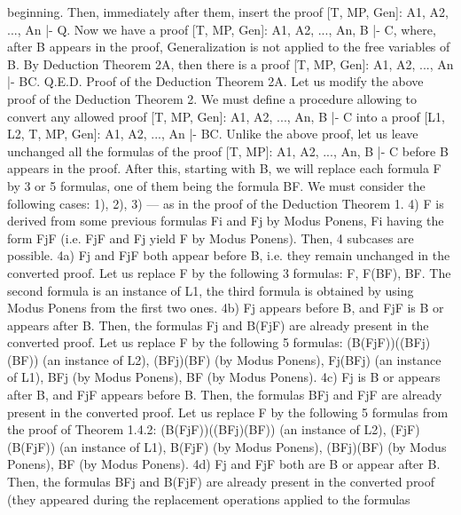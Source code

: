 beginning. Then, immediately after them, insert the proof [T, MP, Gen]: A1, A2, ..., An |- Q. Now we have
a proof [T, MP, Gen]: A1, A2, ..., An, B |- C, where, after B appears in the proof, Generalization is not
applied to the free variables of B. By Deduction Theorem 2A, then there is a proof [T, MP, Gen]: A1,
A2, ..., An |- B\IMPLIES C. Q.E.D.
Proof of the Deduction Theorem 2A. Let us modify the above proof of the Deduction Theorem 2.
We must define a procedure allowing to convert any allowed proof [T, MP, Gen]: A1, A2, ..., An, B |- C
into a proof [L1, L2, T, MP, Gen]: A1, A2, ..., An |- B\IMPLIES C.
Unlike the above proof, let us leave unchanged all the formulas of the proof [T, MP]: A1, A2, ..., An, B |-
C before B appears in the proof. After this, starting with B, we will replace each formula F by 3 or 5
formulas, one of them being the formula B\IMPLIES F.
We must consider the following cases:
1), 2), 3) --- as in the proof of the Deduction Theorem 1.
4) F is derived from some previous formulas Fi and Fj by Modus Ponens, Fi having the form Fj\IMPLIES F (i.e.
Fj\IMPLIES F and Fj yield F by Modus Ponens). Then, 4 subcases are possible.
4a) Fj and Fj\IMPLIES F both appear before B, i.e. they remain unchanged in the converted proof. Let us replace
F by the following 3 formulas: F, F\IMPLIES (B\IMPLIES F), B\IMPLIES F. The second formula is an instance of L1, the third
formula is obtained by using Modus Ponens from the first two ones.
4b) Fj appears before B, and Fj\IMPLIES F is B or appears after B. Then, the formulas Fj and B\IMPLIES (Fj\IMPLIES F) are
already present in the converted proof. Let us replace F by the following 5 formulas:
(B\IMPLIES (Fj\IMPLIES F))\IMPLIES ((B\IMPLIES Fj)\IMPLIES (B\IMPLIES F)) (an instance of L2),
(B\IMPLIES Fj)\IMPLIES (B\IMPLIES F) (by Modus Ponens),
Fj\IMPLIES (B\IMPLIES Fj) (an instance of L1),
B\IMPLIES Fj (by Modus Ponens),
B\IMPLIES F (by Modus Ponens).
4c) Fj is B or appears after B, and Fj\IMPLIES F appears before B. Then, the formulas B\IMPLIES Fj and Fj\IMPLIES F are
already present in the converted proof. Let us replace F by the following 5 formulas from the proof of
Theorem 1.4.2:
(B\IMPLIES (Fj\IMPLIES F))\IMPLIES ((B\IMPLIES Fj)\IMPLIES (B\IMPLIES F)) (an instance of L2),
(Fj\IMPLIES F)\IMPLIES (B\IMPLIES (Fj\IMPLIES F)) (an instance of L1),
B\IMPLIES (Fj\IMPLIES F) (by Modus Ponens),
(B\IMPLIES Fj)\IMPLIES (B\IMPLIES F) (by Modus Ponens),
B\IMPLIES F (by Modus Ponens).
4d) Fj and Fj\IMPLIES F both are B or appear after B. Then, the formulas B\IMPLIES Fj and B\IMPLIES (Fj\IMPLIES F) are already
present in the converted proof (they appeared during the replacement operations applied to the formulas
